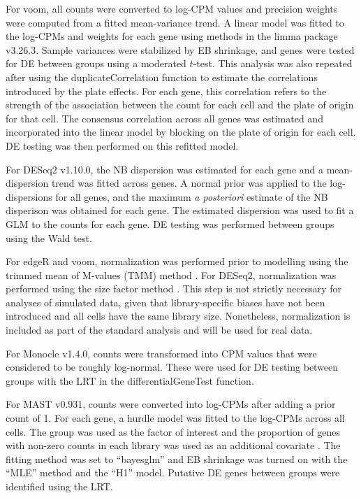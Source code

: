 \documentclass{article}
\begin{document}
For voom, all counts were converted to log-CPM values and precision weights were computed from a fitted mean-variance trend.
A linear model was fitted to the log-CPMs and weights for each gene using methods in the limma package v3.26.3.
Sample variances were stabilized by EB shrinkage, and genes were tested for DE between groups using a moderated $t$-test.
This analysis was also repeated after using the duplicateCorrelation function \citep{smyth2005use} to estimate the correlations introduced by the plate effects.
For each gene, this correlation refers to the strength of the association between the count for each cell and the plate of origin for that cell.
The consensus correlation across all genes was estimated and incorporated into the linear model by blocking on the plate of origin for each cell.
DE testing was then performed on this refitted model.

For DESeq2 v1.10.0, the NB dispersion was estimated for each gene and a mean-dispersion trend was fitted across genes.
A normal prior was applied to the log-dispersions for all genes, and the maximum \textit{a posteriori} estimate of the NB disperison was obtained for each gene.
The estimated dispersion was used to fit a GLM to the counts for each gene.
DE testing was performed between groups using the Wald test.

For edgeR and voom, normalization was performed prior to modelling using the trimmed mean of M-values (TMM) method \citep{robinson2010scaling}.
For DESeq2, normalization was performed using the size factor method \citep{anders2010differential}.
This step is not strictly necessary for analyses of simulated data, given that library-specific biases have not been introduced and all cells have the same library size.
Nonetheless, normalization is included as part of the standard analysis and will be used for real data.

For Monocle v1.4.0, counts were transformed into CPM values that were considered to be roughly log-normal.
These were used for DE testing between groups with the LRT in the differentialGeneTest function.

For MAST v0.931, counts were converted into log-CPMs after adding a prior count of 1.
For each gene, a hurdle model was fitted to the log-CPMs across all cells. 
The group was used as the factor of interest and the proportion of genes with non-zero counts in each library was used as an additional covariate \citep{finak2015mast}.
The fitting method was set to ``bayesglm'' and EB shrinkage was turned on with the ``MLE'' method and the ``H1'' model.
Putative DE genes between groups were identified using the LRT.
\end{document}

